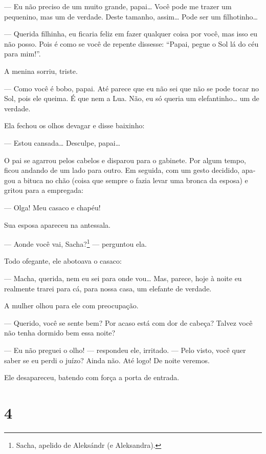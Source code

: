 --- Eu não preciso de um muito grande, papai\ldots{} Você pode me trazer um
pequenino, mas um de verdade. Deste tamanho, assim\ldots{} Pode ser um
filhotinho\ldots{}

--- Querida filhinha, eu ficaria feliz em fazer qual­quer coisa por
você, mas isso eu não posso. Pois é como se você de repente dissesse:
``Papai, pegue o Sol lá do céu para mim!''.

A menina sorriu, triste.

--- Como você é bobo, papai. Até parece que eu não sei que não se pode
tocar no Sol, pois ele queima. É que nem a Lua. Não, eu só queria um
elefantinho\ldots{} um de verdade.

Ela fechou os olhos devagar e disse baixinho:

--- Estou cansada\ldots{} Desculpe, papai\ldots{}

O pai se agarrou pelos cabelos e disparou para o gabinete. Por algum
tempo, ficou andando de um lado para outro. Em seguida, com um gesto
decidido, apa­gou a bituca no chão (coisa que sempre o fazia levar uma
bronca da esposa) e gritou para a empregada:

--- Olga! Meu casaco e chapéu!

Sua esposa apareceu na antessala.

--- Aonde você vai, Sacha?\footnote{Sacha, apelido de Aleksándr (e
  Aleksandra).} --- perguntou ela.

Todo ofegante, ele abotoava o casaco:

--- Macha, querida, nem eu sei para onde vou\ldots{} Mas, parece, hoje à
noite eu realmente trarei para cá, para nossa casa, um elefante de
verdade.

A mulher olhou para ele com preocupação.

--- Querido, você se sente bem? Por acaso está com dor de cabeça? Talvez
você não tenha dormido bem essa noite?

--- Eu não preguei o olho! --- respondeu ele, irritado. --- Pelo visto,
você quer saber se eu perdi o juízo? Ainda não. Até logo! De noite
veremos.

Ele desapareceu, batendo com força a porta de entrada.

\section{4}

